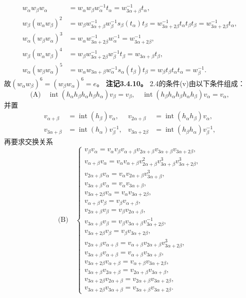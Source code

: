 \[\begin{aligned}w_\alpha w_\beta w_\alpha&=w_\alpha w_\beta w_\alpha^{-1}t_\alpha=w_{3\alpha+\beta}^{-1}t_\alpha,\\
w_\beta(w_\alpha w_\beta)^2&=w_\beta w_{3\alpha+\beta}^{-1}w_\beta^{-1}s_\beta(t_\alpha)t_\beta=w_{3\alpha+2\beta}^{-1}t_\alpha t_\beta t_\beta=w_{3\alpha+2\beta}^{-1}t_\alpha,\\
w_\alpha(w_\beta w_\alpha)^3&=w_\alpha w_{3\alpha+2\beta}^{-1}w_\alpha^{-1}=w_{3\alpha+2\beta}^{-1},\\
w_\beta(w_\alpha w_\beta)^4&=w_\beta w_{3\alpha+2\beta}^{-1}w_\beta^{-1}t_\beta=w_{3\alpha+\beta}t_\beta,\\
w_\alpha(w_\beta w_\alpha)^5&=w_\alpha w_{3\alpha+\beta}w_\alpha^{-1}s_\alpha(t_\beta)t_\beta=w_\beta t_\beta t_\alpha t_\alpha=w_\beta^{-1}.\end{aligned}\]
故$(w_\alpha w_\beta)^6=(w_\beta w_\alpha)^6=e$。
\textbf{注记3.4.10。} 2.4的条件(v)由以下条件组成：
\[\text{(A)}\quad\operatorname{int}(h_\alpha h_\beta h_\alpha h_\beta h_\alpha)v_\beta=v_\beta,\quad\operatorname{int}(h_\beta h_\alpha h_\beta h_\alpha h_\beta)v_\alpha=v_\alpha,\]
并置
\[\begin{aligned}v_{\alpha+\beta}&=\operatorname{int}(h_\beta)v_\alpha,&v_{2\alpha+\beta}&=\operatorname{int}(h_\alpha h_\beta)v_\alpha,\\v_{3\alpha+\beta}&=\operatorname{int}(h_\alpha)v_\beta^{-1},&v_{3\alpha+2\beta}&=\operatorname{int}(h_\beta h_\alpha)v_\beta^{-1},\end{aligned}\]
再要求交换关系
\[\text{(B)}\quad\begin{cases}v_\beta v_\alpha=v_\alpha v_\beta v_{\alpha+\beta}v_{2\alpha+\beta}v_{3\alpha+\beta}v_{3\alpha+2\beta},\\v_{\alpha+\beta}v_\alpha=v_\alpha v_{\alpha+\beta}v_{2\alpha+\beta}^2v_{3\alpha+\beta}^3v_{3\alpha+2\beta}^3,\\v_{2\alpha+\beta}v_\alpha=v_\alpha v_{2\alpha+\beta}v_{3\alpha+\beta}^3,\\v_{3\alpha+\beta}v_\alpha=v_\alpha v_{3\alpha+\beta},\\v_{3\alpha+2\beta}v_\alpha=v_\alpha v_{3\alpha+2\beta},\\v_{\alpha+\beta}v_\beta=v_\beta v_{\alpha+\beta},\\v_{2\alpha+\beta}v_\beta=v_\beta v_{2\alpha+\beta},\\v_{3\alpha+\beta}v_\beta=v_\beta v_{3\alpha+\beta}v_{3\alpha+2\beta}^{-1},\\v_{3\alpha+2\beta}v_\beta=v_\beta v_{3\alpha+2\beta},\\v_{2\alpha+\beta}v_{\alpha+\beta}=v_{\alpha+\beta}v_{2\alpha+\beta}v_{3\alpha+2\beta}^3,\\v_{3\alpha+\beta}v_{\alpha+\beta}=v_{\alpha+\beta}v_{3\alpha+\beta},\\v_{3\alpha+2\beta}v_{\alpha+\beta}=v_{\alpha+\beta}v_{3\alpha+2\beta},\\v_{3\alpha+\beta}v_{2\alpha+\beta}=v_{2\alpha+\beta}v_{3\alpha+\beta},\\v_{3\alpha+2\beta}v_{2\alpha+\beta}=v_{2\alpha+\beta}v_{3\alpha+2\beta},\\v_{3\alpha+2\beta}v_{3\alpha+\beta}=v_{3\alpha+\beta}v_{3\alpha+2\beta}.\end{cases}\]

